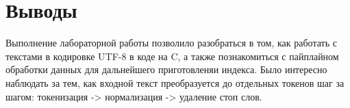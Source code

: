 \section{Выводы}
Выполнение лабораторной работы позволило разобраться в том, как работать с текстами в кодировке UTF-8 в коде на C, а также познакомиться с пайплайном обработки данных для дальнейшего приготовленяи индекса. Было интересно наблюдать за тем, как входной текст преобразуется до отдельных токенов шаг за шагом: токенизация -> нормализация -> удаление стоп слов.
\pagebreak
